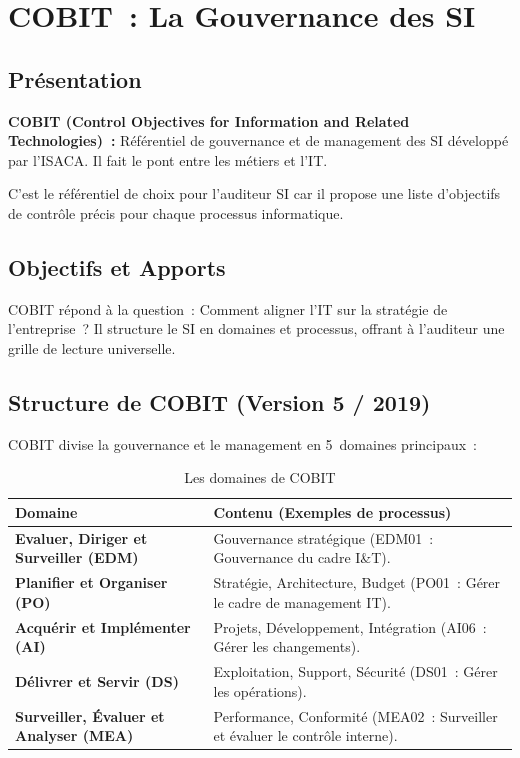 \section{COBIT~: La Gouvernance des SI}
\label{sec:cobit}

\subsection{Présentation}

\begin{boxdef}
\textbf{COBIT (Control Objectives for Information and Related Technologies)~:} Référentiel
de gouvernance et de management des SI développé par l'ISACA. Il fait le pont entre les
métiers et l'IT.
\end{boxdef}

C'est le référentiel de choix pour l'auditeur SI car il propose une liste d'objectifs de
contrôle précis pour chaque processus informatique.

\subsection{Objectifs et Apports}

COBIT répond à la question~: \og{}Comment aligner l'IT sur la stratégie de l'entreprise~?\fg{}
Il structure le SI en domaines et processus, offrant à l'auditeur une grille de lecture
universelle.

\subsection{Structure de COBIT (Version 5 / 2019)}

COBIT divise la gouvernance et le management en 5~domaines principaux~:

\begin{table}[h!]
\centering
\small
\begin{tabular}{p{2.8cm}p{10.2cm}}
    \toprule
    \textbf{Domaine} & \textbf{Contenu (Exemples de processus)} \\
    \midrule
    \textbf{Evaluer, Diriger et Surveiller (EDM)} & Gouvernance stratégique
        (EDM01~: Gouvernance du cadre I\&T). \\
    \midrule
    \textbf{Planifier et Organiser (PO)} & Stratégie, Architecture, Budget
        (PO01~: Gérer le cadre de management IT). \\
    \midrule
    \textbf{Acquérir et Implémenter (AI)} & Projets, Développement, Intégration
        (AI06~: Gérer les changements). \\
    \midrule
    \textbf{Délivrer et Servir (DS)} & Exploitation, Support, Sécurité
        (DS01~: Gérer les opérations). \\
    \midrule
    \textbf{Surveiller, Évaluer et Analyser (MEA)} & Performance, Conformité
        (MEA02~: Surveiller et évaluer le contrôle interne). \\
    \bottomrule
\end{tabular}
\caption{Les domaines de COBIT}
\end{table}
